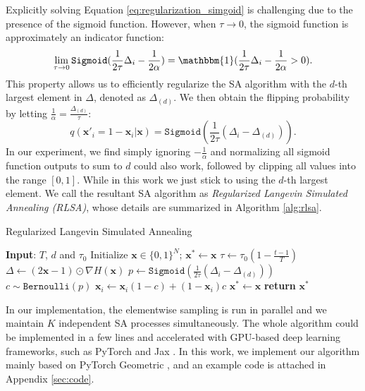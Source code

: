 Explicitly solving Equation \ref{eq:regularization_simgoid} is challenging due to the presence of the sigmoid function. However, when $\tau\to0$, the sigmoid function is approximately an indicator function:
\begin{equation} 
    \lim_{\tau\to 0}\texttt{Sigmoid}(\frac{1}{2\tau}\Delta_i-\frac{1}{2\alpha})=\mathbbm{1}(\frac{1}{2\tau}\Delta_i-\frac{1}{2\alpha}>0).
\end{equation}
This property allows us to efficiently regularize the SA algorithm with the $d$-th largest element in $\Delta$, denoted as $\Delta_{(d)}$. We then obtain the flipping probability by letting $\frac{1}{\alpha}=\frac{\Delta_{(d)}}{\tau}$:
\begin{equation}
    q(\mathbf{x}'_i=1-\mathbf{x}_i|\mathbf{x}) = \texttt{Sigmoid}(\frac{1}{2\tau}(\Delta_i-\Delta_{(d)})).
\end{equation}
In our experiment, we find simply ignoring $-\frac{1}{\alpha}$ and normalizing all sigmoid function outputs to sum to $d$ could also work, followed by clipping all values into the range $[0,1]$. While in this work we just stick to using the $d$-th largest element. We call the resultant SA algorithm as \textit{Regularized Langevin Simulated Annealing (RLSA)}, whose details are summarized in Algorithm \ref{alg:rlsa}.

\begin{algorithm}[H]
\caption{Regularized Langevin Simulated Annealing}
\label{alg:rlsa}
\begin{algorithmic}[1] %
\STATE \textbf{Input}: $T$, $d$ and $\tau_0$
\STATE Initialize $\mathbf{x}\in \{0,1\}^{N}$; $\mathbf{x}^*\leftarrow \mathbf{x}$
\STATE  $\tau \leftarrow \tau_0(1-\frac{t-1}{T})$ 
\STATE $\Delta \leftarrow(2\mathbf{x}-1)\odot \nabla H(\mathbf{x})$
\STATE $p \leftarrow \texttt{Sigmoid}(\frac{1}{2\tau}(\Delta_i-\Delta_{(d)}))$
\STATE $c \sim \texttt{Bernoulli}(p)$
\STATE $\mathbf{x}_i \leftarrow \mathbf{x}_i(1-c)+(1-\mathbf{x}_i)c$
\ENDFOR 
{}
\STATE $\mathbf{x}^*\leftarrow \mathbf{x}$
\ENDIF
\ENDFOR
\STATE\textbf{return} $\mathbf{x}^*$ 
\end{algorithmic}
\end{algorithm} 
In our implementation, the elementwise sampling is run in parallel and we maintain $K$ independent SA processes simultaneously. The whole algorithm could be implemented in a few lines and accelerated with GPU-based deep learning frameworks, such as PyTorch \citep{paszke2017automatic} and Jax \citep{jax2018github}. In this work, we implement our algorithm mainly based on PyTorch Geometric \citep{Fey/Lenssen/2019}, and an example code is attached in Appendix \ref{sec:code}. 


